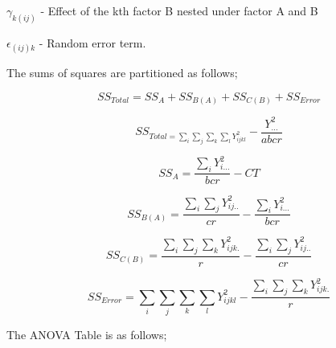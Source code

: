 \documentclass[
]{article}
\begin{document}
\(\gamma_{k(ij)}\) - Effect of the kth factor B nested under factor A
and B

\(\epsilon_{(ij)k}\) - Random error term.

The sums of squares are partitioned as follows;

\[SS_{Total}=SS_A+SS_{B(A)}+SS_{C(B)}+SS_{Error}\]

\[SS_{Total = \sum_i\sum_j\sum_k\sum_lY_{ijkl}^2}-\frac{Y_{...}^2}{abcr}\]

\[SS_A = \frac{\sum_iY_{i...}^2}{bcr}-CT\]

\[SS_{B(A)}=\frac{\sum_i\sum_jY_{ij..}^2}{cr}-\frac{\sum_iY_{i...}^2}{bcr}\]

\[SS_{C(B)}=\frac{\sum_i\sum_j\sum_kY_{ijk.}^2}{r}-\frac{\sum_i\sum_jY_{ij..}^2}{cr}\]

\[SS_{Error}=\sum_i\sum_j\sum_k\sum_lY_{ijkl}^2-\frac{\sum_i\sum_j\sum_kY_{ijk.}^2}{r}\]

The ANOVA Table is as follows;
\end{document}
